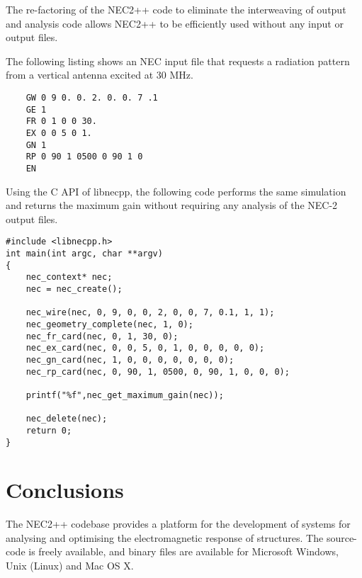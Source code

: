 \documentclass{report}
\begin{document}
The re-factoring of the NEC2++ code to eliminate the interweaving of output and analysis code allows NEC2++ to be efficiently used without any input or output files. 

The following listing shows an NEC input file that requests a radiation pattern from a vertical antenna excited at 30 MHz.
\begin{lstlisting}
	GW 0 9 0. 0. 2. 0. 0. 7 .1
	GE 1
	FR 0 1 0 0 30.
	EX 0 0 5 0 1.
	GN 1
	RP 0 90 1 0500 0 90 1 0
	EN
\end{lstlisting}
Using the C API of libnecpp, the following code performs the same simulation and returns the maximum gain without requiring any analysis of the NEC-2 output files.
\begin{lstlisting}
#include <libnecpp.h>
int main(int argc, char **argv)
{
	nec_context* nec;	
	nec = nec_create();
	
	nec_wire(nec, 0, 9, 0, 0, 2, 0, 0, 7, 0.1, 1, 1);
	nec_geometry_complete(nec, 1, 0);	
	nec_fr_card(nec, 0, 1, 30, 0);
	nec_ex_card(nec, 0, 0, 5, 0, 1, 0, 0, 0, 0, 0);
	nec_gn_card(nec, 1, 0, 0, 0, 0, 0, 0, 0);
	nec_rp_card(nec, 0, 90, 1, 0500, 0, 90, 1, 0, 0, 0);
	
	printf("%f",nec_get_maximum_gain(nec));
	
	nec_delete(nec);
	return 0;
}
\end{lstlisting}

\section{Conclusions}

The NEC2++ codebase provides a platform for the development of systems for analysing and optimising the electromagnetic response of structures. The source-code is freely available, and binary files are available for Microsoft Windows, Unix (Linux) and Mac OS X.
\end{document}
